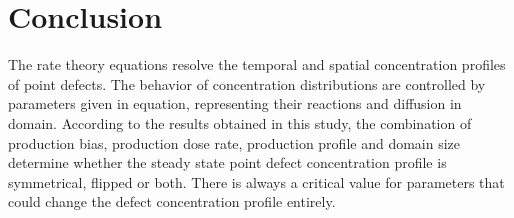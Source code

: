 \documentclass[a4paper]{article}
\begin{document}
%
%
%
%

\section{Conclusion} \hspace{10pt}

The rate theory equations resolve the temporal and spatial concentration profiles of point defects. The behavior of concentration distributions are controlled by parameters given in equation, representing their reactions and diffusion in domain. According to the results obtained in this study, the combination of production bias, production dose rate, production profile and domain size determine whether the steady state point defect concentration profile is symmetrical, flipped or both. There is always a critical value for parameters that could change the defect concentration profile entirely.



\end{document}
